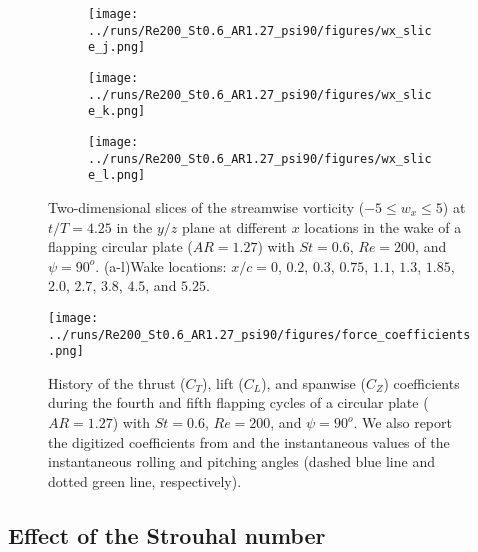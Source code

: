 \begin{figure}
  \begin{subfigure}[b]{0.2\textwidth}
    \centering
    \texttt{[image: ../runs/Re200\_St0.6\_AR1.27\_psi90/figures/wx\_slice\_j.png]}
    \caption{}
  \end{subfigure}
  \hfill
  \begin{subfigure}[b]{0.2\textwidth}
    \centering
    \texttt{[image: ../runs/Re200\_St0.6\_AR1.27\_psi90/figures/wx\_slice\_k.png]}
    \caption{}
  \end{subfigure}
  \hfill
  \begin{subfigure}[b]{0.2\textwidth}
    \centering
    \texttt{[image: ../runs/Re200\_St0.6\_AR1.27\_psi90/figures/wx\_slice\_l.png]}
    \caption{}
  \end{subfigure}
  \caption{Two-dimensional slices of the streamwise vorticity ($-5 \leq w_x \leq 5$) at $t / T = 4.25$ in the $y/z$ plane at different $x$ locations in the wake of a flapping circular plate ($AR = 1.27$) with $St = 0.6$, $Re = 200$, and $\psi = 90^o$. (a-l)Wake locations: $x / c = 0$, $0.2$, $0.3$, $0.75$, $1.1$, $1.3$, $1.85$, $2.0$, $2.7$, $3.8$, $4.5$, and $5.25$.}
  \label{fig:baseline_wx_slices}
\end{figure}

\begin{figure}
  \centering
  \texttt{[image: ../runs/Re200\_St0.6\_AR1.27\_psi90/figures/force\_coefficients.png]}
  \caption{History of the thrust ($C_T$), lift ($C_L$), and spanwise ($C_Z$) coefficients during the fourth and fifth flapping cycles of a circular plate ($AR = 1.27$) with $St = 0.6$, $Re = 200$, and $\psi = 90^o$. We also report the digitized coefficients from \cite{li_dong_2016} and the instantaneous values of the instantaneous rolling and pitching angles (dashed blue line and dotted green line, respectively).}
  \label{fig:baseline_force_coefficients}
\end{figure}

\subsection{Effect of the Strouhal number}

